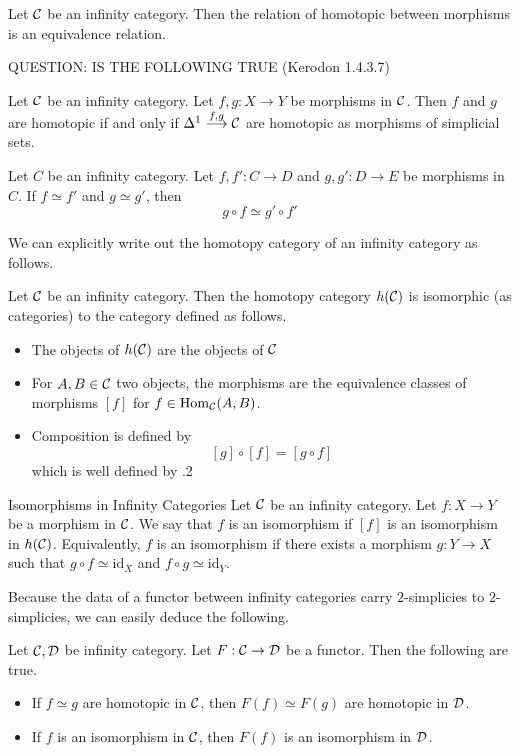 \documentclass[a4paper]{article}
\begin{document}
\begin{lmm}{}{} Let $\mathcal{C}$ be an infinity category. Then the relation of homotopic between morphisms is an equivalence relation. 
\end{lmm}

QUESTION: IS THE FOLLOWING TRUE (Kerodon 1.4.3.7)

\begin{prp}{}{} Let $\mathcal{C}$ be an infinity category. Let $f,g:X\to Y$ be morphisms in $\mathcal{C}$. Then $f$ and $g$ are homotopic if and only if $\Delta^1\overset{f,g}{\longrightarrow}\mathcal{C}$ are homotopic as morphisms of simplicial sets. 
\end{prp}

\begin{prp}{}{} Let $C$ be an infinity category. Let $f,f':C\to D$ and $g,g':D\to E$ be morphisms in $C$. If $f\simeq f'$ and $g\simeq g'$, then $$g\circ f\simeq g'\circ f'$$
\end{prp}

We can explicitly write out the homotopy category of an infinity category as follows. 

\begin{prp}{}{} Let $\mathcal{C}$ be an infinity category. Then the homotopy category $h(\mathcal{C})$ is isomorphic (as categories) to the category defined as follows. 
\begin{itemize}
\item The objects of $h(\mathcal{C})$ are the objects of $\mathcal{C}$
\item For $A,B\in\mathcal{C}$ two objects, the morphisms are the equivalence classes of morphisms $[f]$ for $f\in\operatorname{Hom}_{\mathcal{C}}(A,B)$. 
\item Composition is defined by $$[g]\circ[f]=[g\circ f]$$ which is well defined by .2
\end{itemize}
\end{prp}

\begin{defn}{Isomorphisms in Infinity Categories}{} Let $\mathcal{C}$ be an infinity category. Let $f:X\to Y$ be a morphism in $\mathcal{C}$. We say that $f$ is an isomorphism if $[f]$ is an isomorphism in $h(\mathcal{C})$. Equivalently, $f$ is an isomorphism if there exists a morphism $g:Y\to X$ such that $g\circ f\simeq\text{id}_X$ and $f\circ g\simeq\text{id}_Y$. 
\end{defn}

Because the data of a functor between infinity categories carry $2$-simplicies to $2$-simplicies, we can easily deduce the following. 

\begin{lmm}{}{} Let $\mathcal{C},\mathcal{D}$ be infinity category. Let $F:\mathcal{C}\to\mathcal{D}$ be a functor. Then the following are true. 
\begin{itemize}
\item If $f\simeq g$ are homotopic in $\mathcal{C}$, then $F(f)\simeq F(g)$ are homotopic in $\mathcal{D}$. 
\item If $f$ is an isomorphism in $\mathcal{C}$, then $F(f)$ is an isomorphism in $\mathcal{D}$. 
\end{itemize}
\end{lmm}
\end{document}
